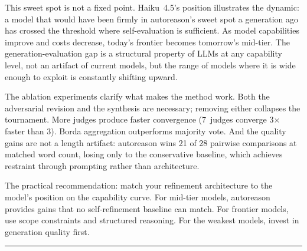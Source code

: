 \documentclass[11pt]{article}
\begin{document}
This sweet spot is not a fixed point. Haiku~4.5's position illustrates the dynamic: a model that would have been firmly in autoreason's sweet spot a generation ago has crossed the threshold where self-evaluation is sufficient. As model capabilities improve and costs decrease, today's frontier becomes tomorrow's mid-tier. The generation-evaluation gap is a structural property of LLMs at any capability level, not an artifact of current models, but the range of models where it is wide enough to exploit is constantly shifting upward.

The ablation experiments clarify what makes the method work. Both the adversarial revision and the synthesis are necessary; removing either collapses the tournament. More judges produce faster convergence (7~judges converge 3$\times$ faster than 3). Borda aggregation outperforms majority vote. And the quality gains are not a length artifact: autoreason wins 21 of 28 pairwise comparisons at matched word count, losing only to the conservative baseline, which achieves restraint through prompting rather than architecture.

The practical recommendation: match your refinement architecture to the model's position on the capability curve. For mid-tier models, autoreason provides gains that no self-refinement baseline can match. For frontier models, use scope constraints and structured reasoning. For the weakest models, invest in generation quality first.

\vspace{4pt}
\hrule
\vspace{6pt}
\end{document}
